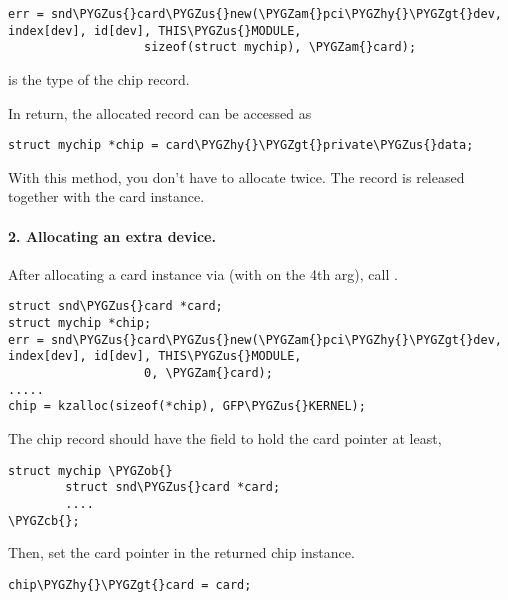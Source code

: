 \documentclass[a4paper,8pt,english]{sphinxmanual}
\def\PYGZus{\char`\_}
\def\PYGZob{\char`\{}
\def\PYGZcb{\char`\}}
\def\PYGZam{\char`\&}
\def\PYGZgt{\char`\>}
\def\PYGZhy{\char`\-}
\begin{document}
\begin{Verbatim}[commandchars=\\\{\}]
err = snd\PYGZus{}card\PYGZus{}new(\PYGZam{}pci\PYGZhy{}\PYGZgt{}dev, index[dev], id[dev], THIS\PYGZus{}MODULE,
                   sizeof(struct mychip), \PYGZam{}card);
\end{Verbatim}

 is the type of the chip record.

In return, the allocated record can be accessed as

\begin{Verbatim}[commandchars=\\\{\}]
struct mychip *chip = card\PYGZhy{}\PYGZgt{}private\PYGZus{}data;
\end{Verbatim}

With this method, you don't have to allocate twice. The record is
released together with the card instance.


\paragraph{2. Allocating an extra device.}
\label{sound/kernel-api/writing-an-alsa-driver:allocating-an-extra-device}
After allocating a card instance via 
(with  on the 4th arg), call .

\begin{Verbatim}[commandchars=\\\{\}]
struct snd\PYGZus{}card *card;
struct mychip *chip;
err = snd\PYGZus{}card\PYGZus{}new(\PYGZam{}pci\PYGZhy{}\PYGZgt{}dev, index[dev], id[dev], THIS\PYGZus{}MODULE,
                   0, \PYGZam{}card);
.....
chip = kzalloc(sizeof(*chip), GFP\PYGZus{}KERNEL);
\end{Verbatim}

The chip record should have the field to hold the card pointer at least,

\begin{Verbatim}[commandchars=\\\{\}]
struct mychip \PYGZob{}
        struct snd\PYGZus{}card *card;
        ....
\PYGZcb{};
\end{Verbatim}

Then, set the card pointer in the returned chip instance.

\begin{Verbatim}[commandchars=\\\{\}]
chip\PYGZhy{}\PYGZgt{}card = card;
\end{Verbatim}
\end{document}
